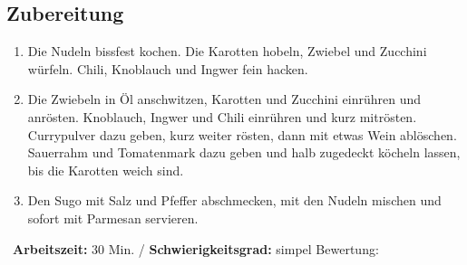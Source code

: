 \begin{minipage}[t]{0.58\textwidth}
\vspace{0pt}
\subsection*{Zubereitung}
\begin{enumerate}[leftmargin=*, itemindent=14pt]
\item Die Nudeln bissfest kochen. Die Karotten hobeln, Zwiebel und Zucchini würfeln. Chili, Knoblauch und Ingwer fein hacken. 

\item Die Zwiebeln in Öl anschwitzen, Karotten und Zucchini einrühren und anrösten. Knoblauch, Ingwer und Chili einrühren und kurz mitrösten. Currypulver dazu geben, kurz weiter rösten, dann mit etwas Wein ablöschen. Sauerrahm und Tomatenmark dazu geben und halb zugedeckt köcheln lassen, bis die Karotten weich sind. 

\item Den Sugo mit Salz und Pfeffer abschmecken, mit den Nudeln mischen und sofort mit Parmesan servieren.
\end{enumerate}
\end{minipage}
\vfill
\decothreeright \, \textbf{Arbeitszeit:} 30 Min. / \textbf{Schwierigkeitsgrad:} simpel \decothreeleft \hfill Bewertung:  \CIRCLE \CIRCLE \CIRCLE  \Circle \Circle